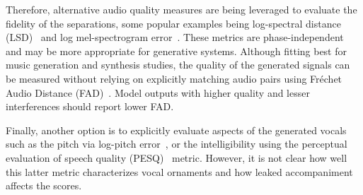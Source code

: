 %
Therefore, alternative audio quality measures are being leveraged to evaluate the fidelity of the separations, some popular examples being log-spectral distance (LSD)~\citep{liu-audioldm} and log mel-spectrogram error~\citep{guso-losses,karchkhadze-msdm_ldm,chae-mge}.
These metrics are phase-independent and may be more appropriate for generative systems.
%
Although fitting best for music generation and synthesis studies, the quality of the generated signals can be measured without relying on explicitly matching audio pairs using Fréchet Audio Distance (FAD)~\citep{gui-adapting}. Model outputs with higher quality and lesser interferences should report lower FAD. %
%
%


Finally, another option is to explicitly evaluate aspects of the generated vocals such as the pitch via log-pitch error~\citep{yi-singing}, or the intelligibility using the perceptual evaluation of speech quality (PESQ)~\citep{pesq} metric. However, it is not clear how well this latter metric characterizes vocal ornaments and how leaked accompaniment affects the scores.


